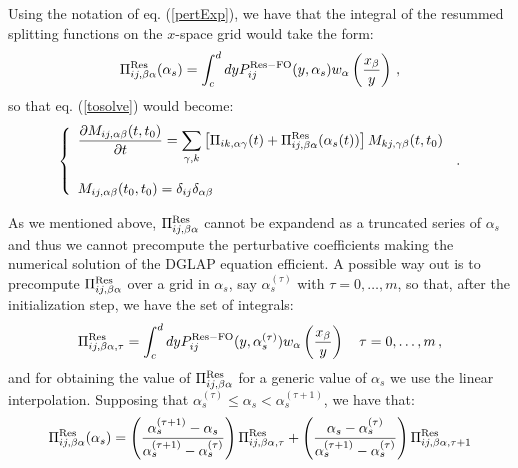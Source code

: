 \documentclass[10pt,a4paper]{article}
\begin{document}
Using the notation of eq. (\ref{pertExp}), we have that the integral of
the resummed splitting functions on the $x$-space grid would take the form:
\begin{equation}
\Pi_{ij,\beta\alpha}^{\rm Res}(\alpha_s) = \int^{d}_{c}dy{P}_{ij}^{\rm Res-FO}(y,\alpha_s)w_{\alpha}\left(\frac{x_\beta}{y}\right)\,,
\end{equation}
so that eq. (\ref{tosolve}) would become:
\begin{equation}\label{tosolveRes}
\left\{\begin{array}{l}
\displaystyle \frac{\partial  M_{ij,\alpha\beta}(t,t_0)}{\partial t}=\sum_{\gamma,k} \left[\Pi_{ik,\alpha\gamma}(t)+\Pi_{ij,\beta\alpha}^{\rm Res}(\alpha_s(t))\right]M_{kj,\gamma\beta}(t,t_0)\\
\\
\displaystyle M_{ij,\alpha\beta}(t_0,t_0)=\delta_{ij}\delta_{\alpha\beta}
\end{array}\right.\,.
\end{equation}

As we mentioned above, $\Pi_{ij,\beta\alpha}^{\rm Res}$ cannot be
expandend as a truncated series of $\alpha_s$ and thus we cannot
precompute the perturbative coefficients making the numerical solution
of the DGLAP equation efficient. 
A possible way out is to precompute
$\Pi_{ij,\beta\alpha}^{\rm Res}$ over a grid in $\alpha_s$, say
$\alpha_s^{(\tau)}$ with $\tau = 0,\dots,m$, so that, after the
initialization step, we have the set of integrals:
\begin{equation}
\Pi_{ij,\beta\alpha,\tau}^{\rm Res} = \int^{d}_{c}dy{P}_{ij}^{\rm
  Res-FO}(y,\alpha_s^{(\tau)})w_{\alpha}\left(\frac{x_\beta}{y}\right)\quad
\tau = 0,\dots,m\,,
\end{equation}
and for obtaining the value of $\Pi_{ij,\beta\alpha}^{\rm Res}$ for a
generic value of $\alpha_s$ we use the linear interpolation. Supposing
that $\alpha_s^{(\tau)}\leq\alpha_s<\alpha_s^{(\tau+1)}$, we have that:
\begin{equation}
\Pi_{ij,\beta\alpha}^{\rm Res}(\alpha_s) =
\left(\frac{\alpha_s^{(\tau+1)}-\alpha_s}{\alpha_s^{(\tau+1)}-\alpha_s^{(\tau)}}\right)\Pi_{ij,\beta\alpha,\tau}^{\rm Res} +\left(\frac{\alpha_s-\alpha_s^{(\tau)}}{\alpha_s^{(\tau+1)}-\alpha_s^{(\tau)}}\right)\Pi_{ij,\beta\alpha,\tau+1}^{\rm Res}
\end{equation}
\end{document}
